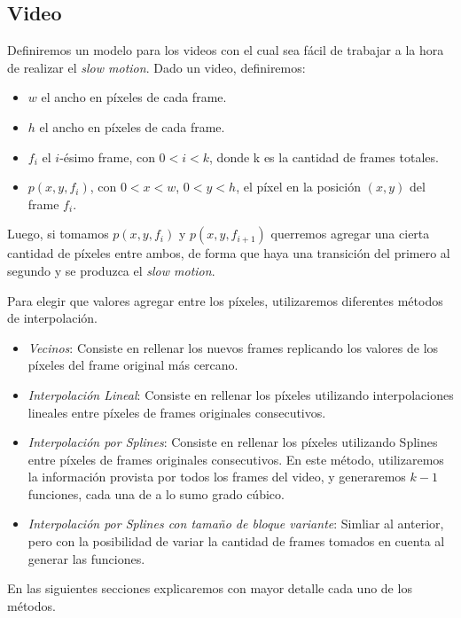 \subsection{Video}

Definiremos un modelo para los videos con el cual sea fácil de trabajar a la hora de realizar
el \textit{slow motion}.
Dado un video, definiremos:
\begin{itemize}
    \item $w$ el ancho en píxeles de cada frame.
    \item $h$ el ancho en píxeles de cada frame.
    \item $f_i$ el $i$-ésimo frame, con $0< i < k$, donde k es la cantidad de frames totales.
    \item $p(x,y,f_i)$, con $0 < x < w$, $0< y < h$, el píxel en la posición $(x,y)$ del frame $f_i$.
\end{itemize}

Luego, si tomamos $p(x,y,f_i)$ y $p(x,y,f_{i+1})$ querremos agregar una cierta cantidad
de píxeles entre ambos, de forma que haya una transición del primero al segundo y
se produzca el \textit{slow motion}.

Para elegir que valores agregar entre los píxeles, utilizaremos diferentes métodos
de interpolación.
\begin{itemize}
    \item \textit{Vecinos}: Consiste en rellenar los nuevos frames replicando los
        valores de los píxeles del frame original más cercano.
    \item \textit{Interpolación Lineal}: Consiste en rellenar los píxeles utilizando
        interpolaciones lineales entre píxeles de frames originales consecutivos.
    \item \textit{Interpolación por Splines}: Consiste en rellenar los píxeles utilizando
        Splines entre píxeles de frames originales consecutivos. En este método,
        utilizaremos la información provista por todos los frames del video,
        y generaremos $k-1$ funciones, cada una de a lo sumo grado cúbico.
    \item \textit{Interpolación por Splines con tamaño de bloque variante}:
        Simliar al anterior, pero con la posibilidad de variar la cantidad de frames
        tomados en cuenta al generar las funciones.
\end{itemize}

En las siguientes secciones explicaremos con mayor detalle cada uno de los métodos.

